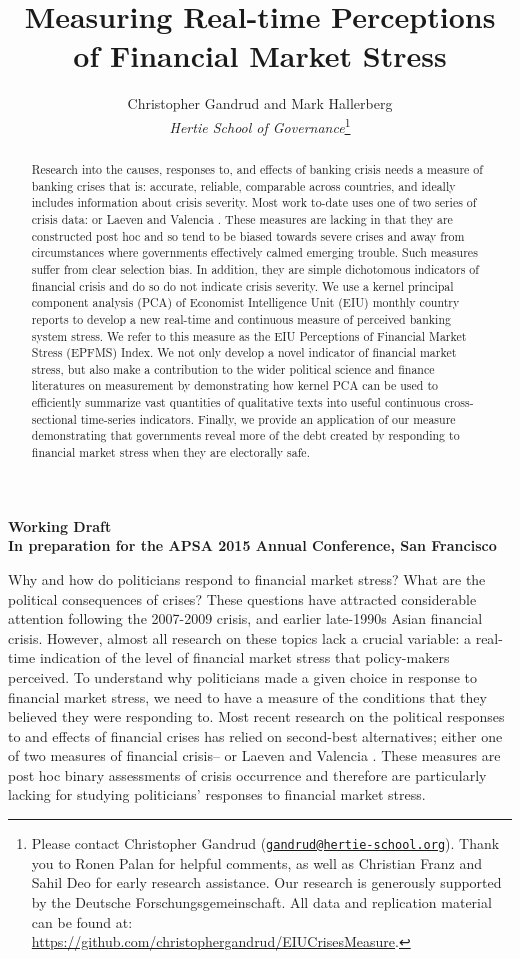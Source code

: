 \documentclass[]{article}
\title{Measuring Real-time Perceptions of Financial Market Stress}
\author{Christopher Gandrud and Mark Hallerberg \\ \emph{Hertie School of Governance}\footnote{Please contact Christopher Gandrud
(\href{mailto:gandrud@hertie-school.org}{\nolinkurl{gandrud@hertie-school.org}}).
Thank you to Ronen Palan for helpful comments, as well as Christian Franz and Sahil Deo for early research assistance. Our research is generously supported by the Deutsche Forschungsgemeinschaft. All data and replication material can be found at:
\url{https://github.com/christophergandrud/EIUCrisesMeasure}.}}
\begin{document}
\maketitle

\begin{center}
    \textbf{Working Draft \\ In preparation for the APSA 2015 Annual Conference, San Francisco}
\end{center}

\begin{abstract}
    Research into the causes, responses to, and effects of banking crisis needs a measure of banking crises that is: accurate, reliable, comparable across countries, and ideally includes information about crisis severity. Most work to-date uses one of two series of crisis data: \cite{Reinhart2009,ReinhartRog2010} or Laeven and Valencia \citeyearpar[and their predecessors]{laeven2013}. These measures are lacking in that they are constructed post hoc and so tend to be biased towards severe crises and away from circumstances where governments effectively calmed emerging trouble. Such measures suffer from clear selection bias. In addition, they are simple dichotomous indicators of financial crisis and do so do not indicate crisis severity. We use a kernel principal component analysis (PCA) of Economist Intelligence Unit (EIU) monthly country reports to develop a new real-time and continuous measure of perceived banking system stress. We refer to this measure as the EIU Perceptions of Financial Market Stress (EPFMS) Index. We not only develop a novel indicator of financial market stress, but also make a contribution to the wider political science and finance literatures on measurement by demonstrating how kernel PCA can be used to efficiently summarize vast quantities of qualitative texts into useful continuous cross-sectional time-series indicators. Finally, we provide an application of our measure demonstrating that governments reveal more of the debt created by responding to financial market stress when they are electorally safe.
\end{abstract}

Why and how do politicians respond to financial market stress? What are the political consequences of crises? These questions have attracted considerable attention following the
2007-2009 crisis, and earlier late-1990s Asian financial crisis. However, almost all research on these topics lack a crucial variable: a real-time indication of the level of financial
market stress that policy-makers perceived. To understand why politicians made a given choice in response to financial market stress, we need to have a measure of the conditions that they believed they were responding to. Most recent research on the political responses to and effects of financial crises has relied on second-best alternatives; either one of two measures of financial crisis--\cite{Reinhart2009,ReinhartRog2010} or Laeven and Valencia \citeyearpar[and their predecessors]{laeven2013}. These measures are post hoc binary assessments of crisis occurrence and therefore are particularly lacking for studying politicians' responses to financial market stress.
\end{document}

